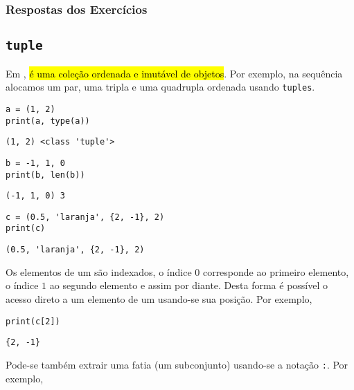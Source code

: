 \ifisbook 
\subsubsection*{Respostas dos Exercícios}
\shipoutAnswer
\fi


\subsection{\texttt{tuple}}

Em {\python}, \hl{{\PYTHONtuple} é uma coleção ordenada e imutável de objetos}. Por exemplo, na sequência alocamos um par, uma tripla e uma quadrupla ordenada usando \texttt{tuples}.

\begin{lstlisting}
a = (1, 2)
print(a, type(a))
\end{lstlisting}

\begin{verbatim}
(1, 2) <class 'tuple'>
\end{verbatim}

\begin{lstlisting}
b = -1, 1, 0
print(b, len(b))
\end{lstlisting}

\begin{verbatim}
(-1, 1, 0) 3
\end{verbatim}

\begin{lstlisting}
c = (0.5, 'laranja', {2, -1}, 2)
print(c)
\end{lstlisting}

\begin{verbatim}
(0.5, 'laranja', {2, -1}, 2)
\end{verbatim}

Os elementos de um {\PYTHONtuple} são indexados, o índice $0$ corresponde ao primeiro elemento, o índice $1$ ao segundo elemento e assim por diante. Desta forma é possível o acesso direto a um elemento de um {\PYTHONtuple} usando-se sua posição. Por exemplo,

\begin{lstlisting}
print(c[2])
\end{lstlisting}

\begin{verbatim}
{2, -1}
\end{verbatim}

Pode-se também extrair uma fatia (um subconjunto) usando-se a notação
\texttt{:}. Por exemplo,

